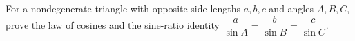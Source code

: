 For a nondegenerate triangle with opposite side lengths $a,b,c$ and angles $A,B,C$, prove the law of cosines and the sine-ratio identity $\dfrac{a}{\sin A}=\dfrac{b}{\sin B}=\dfrac{c}{\sin C}$.
